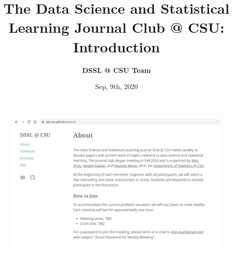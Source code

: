 \documentclass[10pt]{beamer}
\title[DSSL Introduction]
{\bf  \large The Data Science and Statistical Learning Journal Club @ CSU: Introduction}
\author[DSSL @ CSU]{\bf \normalsize  \texorpdfstring{\color{blue}}{} DSSL @ CSU Team}
\institute[Colorado State University]
\date[\today]{Sep, 9th, 2020}
\begin{document}


\begin{frame}

\maketitle

\end{frame}
 


 
  





\begin{frame}
\begin{figure}[h!]
\centering
\includegraphics[scale=0.4]{f1.png}
\end{figure} 
\end{frame}
\end{document}
